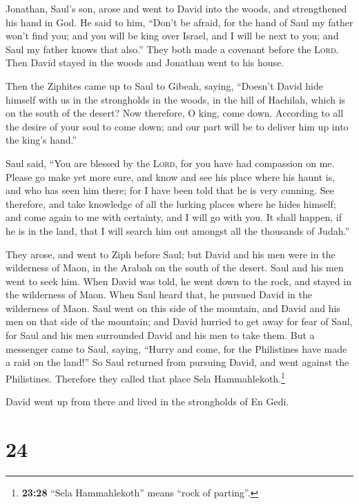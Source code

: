 Jonathan, Saul's son, arose and went to David into the
woods, and strengthened his hand in God.  He said to him,
``Don't be afraid, for the hand of Saul my father won't find you; and
you will be king over Israel, and I will be next to you; and Saul my
father knows that also.''  They both made a covenant
before the \textsc{Lord}. Then David stayed in the woods and Jonathan
went to his house.

 Then the Ziphites came up to Saul to Gibeah, saying,
``Doesn't David hide himself with us in the strongholds in the woods, in
the hill of Hachilah, which is on the south of the desert?
 Now therefore, O king, come down. According to all the
desire of your soul to come down; and our part will be to deliver him up
into the king's hand.''

 Saul said, ``You are blessed by the \textsc{Lord}, for
you have had compassion on me.  Please go make yet more
sure, and know and see his place where his haunt is, and who has seen
him there; for I have been told that he is very cunning. 
See therefore, and take knowledge of all the lurking places where he
hides himself; and come again to me with certainty, and I will go with
you. It shall happen, if he is in the land, that I will search him out
amongst all the thousands of Judah.''

 They arose, and went to Ziph before Saul; but David and
his men were in the wilderness of Maon, in the Arabah on the south of
the desert.  Saul and his men went to seek him. When
David was told, he went down to the rock, and stayed in the wilderness
of Maon. When Saul heard that, he pursued David in the wilderness of
Maon.  Saul went on this side of the mountain, and David
and his men on that side of the mountain; and David hurried to get away
for fear of Saul, for Saul and his men surrounded David and his men to
take them.  But a messenger came to Saul, saying, ``Hurry
and come, for the Philistines have made a raid on the land!''
 So Saul returned from pursuing David, and went against
the Philistines. Therefore they called that place Sela
Hammahlekoth.\footnote{\textbf{23:28} ``Sela Hammahlekoth'' means ``rock
  of parting''.}

 David went up from there and lived in the strongholds of
En Gedi.

\hypertarget{section-23}{%
\section{24}\label{section-23}}

